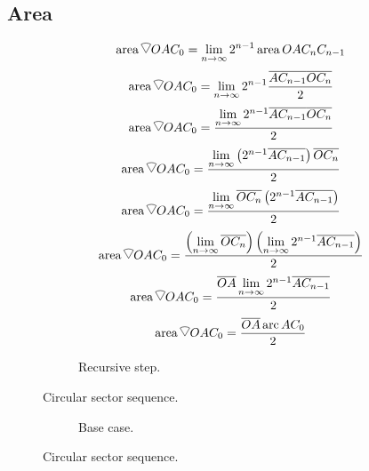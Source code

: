 \documentclass[a4paper,12pt]{report}
\DeclareMathOperator{\arc}{arc}
\DeclareMathOperator{\area}{area}
\newcommand{\circularsector}{
    \begin{tikzpicture}[baseline=-0.1ex, scale=0.27]
        \draw (0,0) -- (60:1) arc (60:120:1) -- cycle;
    \end{tikzpicture}
}
\begin{document}
\subsection{Area}
\begin{equation}
\area \circularsector OAC_0 = \lim \limits_{n \to \infty} 2^{n-1} \area OAC_nC_{n-1}
\end{equation}
\begin{equation}
\area \circularsector OAC_0 = \lim \limits_{n \to \infty} 2^{n-1} \frac{\overline{AC_{n-1}} \overline{OC_n}}{2}
\end{equation}
\begin{equation}
\area \circularsector OAC_0 = \frac{\lim \limits_{n \to \infty} 2^{n-1} \overline{AC_{n-1}} \overline{OC_n}}{2}
\end{equation}
\begin{equation}
\area \circularsector OAC_0 = \frac{\lim \limits_{n \to \infty} \left(2^{n-1} \overline{AC_{n-1}}\right) \overline{OC_n}}{2}
\end{equation}
\begin{equation}
\area \circularsector OAC_0 = \frac{\lim \limits_{n \to \infty} \overline{OC_n} \left(2^{n-1} \overline{AC_{n-1}}\right)}{2}
\end{equation}
\begin{equation}
\area \circularsector OAC_0 = \frac{\left(\lim \limits_{n \to \infty} \overline{OC_n}\right) \left(\lim \limits_{n \to \infty} 2^{n-1} \overline{AC_{n-1}}\right)}{2}
\end{equation}
\begin{equation}
\area \circularsector OAC_0 = \frac{\overline{OA} \lim \limits_{n \to \infty} 2^{n-1} \overline{AC_{n-1}}}{2}
\end{equation}
\begin{equation}
\area \circularsector OAC_0 = \frac{\overline{OA} \arc AC_0}{2}
\end{equation}
\clearpage
\begin{figure}[p]
\centering
\begin{subfigure}{\textwidth}
\centering
\resizebox{\textwidth}{!}{}
\caption{Recursive step.}
\end{subfigure}
\caption{Circular sector sequence.}
\end{figure}
\clearpage
\begin{figure}[p]
\centering
\ContinuedFloat
\begin{subfigure}{\textwidth}
\centering
\resizebox{\textwidth}{!}{}
\caption{Base case.}
\end{subfigure}
\caption{Circular sector sequence.}
\end{figure}
\clearpage
\end{document}
